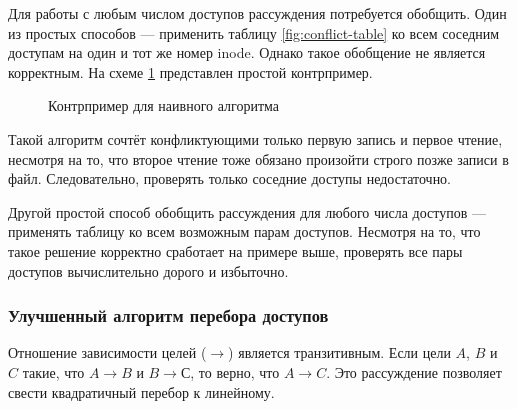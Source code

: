 Для работы с любым числом доступов рассуждения потребуется обобщить. Один из простых способов --- применить таблицу \ref{fig:conflict-table} ко всем соседним доступам на один и тот же номер inode. Однако такое обобщение не является корректным. На схеме \ref{fig:naive-conflict-break} представлен простой контрпример.

\begin{figure}[H]
    \centering
    \caption{Контрпример для наивного алгоритма}
    \label{fig:naive-conflict-break}
\end{figure}

Такой алгоритм сочтёт конфликтующими только первую запись и первое чтение, несмотря на то, что второе чтение тоже обязано произойти строго позже записи в файл. Следовательно, проверять только соседние доступы недостаточно.

Другой простой способ обобщить рассуждения для любого числа доступов --- применять таблицу ко всем возможным парам доступов. Несмотря на то, что такое решение корректно сработает на примере выше, проверять все пары доступов вычислительно дорого и избыточно.

\subsubsection{Улучшенный алгоритм перебора доступов}
\label{subsubsec:linear-time-proof}

Отношение зависимости целей ($\rightarrow$) является транзитивным. Если цели $A$, $B$ и $C$ такие, что $A \rightarrow B$ и $B \rightarrow С$, то верно, что $A \rightarrow C$. Это рассуждение позволяет свести квадратичный перебор к линейному.


